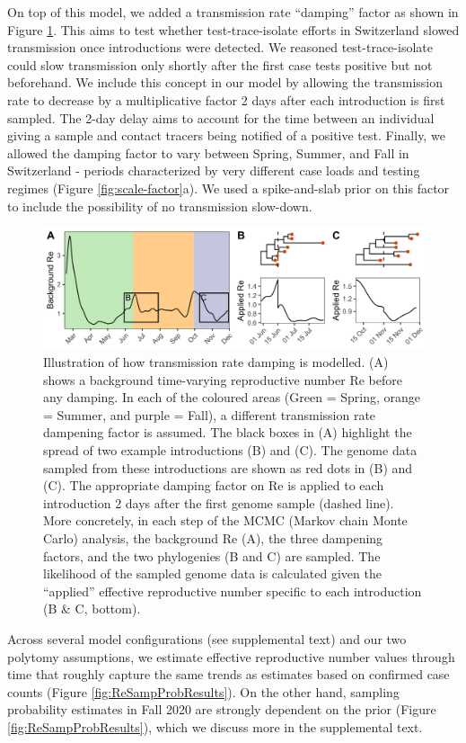 \documentclass[9pt,twoside,lineno]{pnas-new} %
\begin{document}
On top of this model, we added a transmission rate ``damping'' factor as shown in Figure \ref{fig:phylo-methods}. This aims to test whether test-trace-isolate efforts in Switzerland slowed transmission once introductions were detected. We reasoned test-trace-isolate could slow transmission only shortly after the first case tests positive but not beforehand. We include this concept in our model by allowing the transmission rate to decrease by a multiplicative factor 2 days after each introduction is first sampled. The 2-day delay aims to account for the time between an individual giving a sample and contact tracers being notified of a positive test. Finally, we allowed the damping factor to vary between Spring, Summer, and Fall in Switzerland - periods characterized by very different case loads and testing regimes (Figure \ref{fig:scale-factor}a). We used a spike-and-slab prior on this factor to include the possibility of no transmission slow-down. 

\begin{figure}[h!]
\centering
\includegraphics[width=0.75\linewidth]{figures/phylodynamic_method_example.png}
\caption{Illustration of how transmission rate damping is modelled. (A) shows a background time-varying reproductive number Re before any damping. In each of the coloured areas (Green = Spring, orange = Summer, and purple = Fall), a different transmission rate dampening factor is assumed. The black boxes in (A) highlight the spread of two example introductions (B) and (C). The genome data sampled from these introductions are shown as red dots in (B) and (C). The appropriate damping factor on Re is applied to each introduction 2 days after the first genome sample (dashed line). More concretely, in each step of the MCMC (Markov chain Monte Carlo) analysis, the background Re (A), the three dampening factors, and the two phylogenies (B and C) are sampled. The likelihood of the sampled genome data is calculated given the ``applied'' effective reproductive number specific to each introduction (B \& C, bottom).}  
\label{fig:phylo-methods}
\end{figure}

Across several model configurations (see supplemental text) and our two polytomy assumptions, we estimate effective reproductive number values through time that roughly capture the same trends as estimates based on confirmed case counts (Figure \ref{fig:ReSampProbResults}). On the other hand, sampling probability estimates in Fall 2020 are strongly dependent on the prior (Figure \ref{fig:ReSampProbResults}), which we discuss more in the supplemental text.
\end{document}

